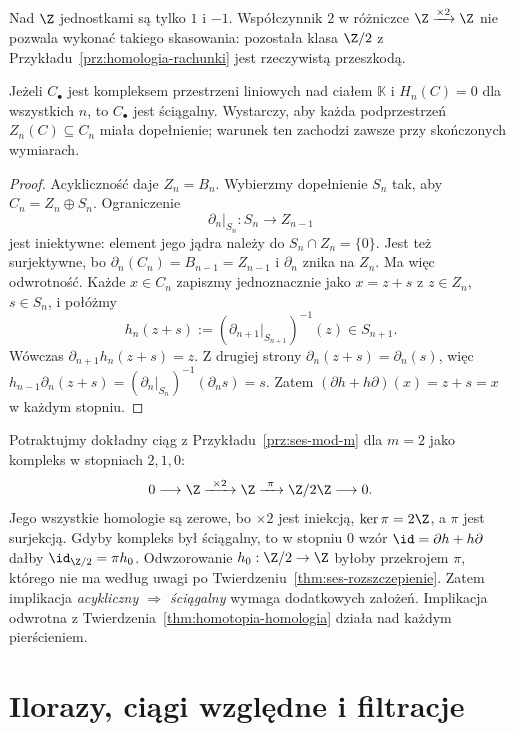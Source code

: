 Nad $\Z$ jednostkami są tylko $1$ i $-1$.
Współczynnik $2$ w różniczce
$\Z\xrightarrow{\times2}\Z$ nie pozwala
wykonać takiego skasowania: pozostała
klasa $\Z/2$ z
Przykładu~\ref{prz:homologia-rachunki}
jest rzeczywistą przeszkodą.

\begin{stwierdzenie}
\label{prop:acykliczny-sciagalny}
Jeżeli $C_\bullet$ jest kompleksem
przestrzeni liniowych nad ciałem
$\mathbb K$ i $H_n(C)=0$ dla wszystkich
$n$, to $C_\bullet$ jest ściągalny.
Wystarczy, aby każda podprzestrzeń
$Z_n(C)\subseteq C_n$ miała dopełnienie;
warunek ten zachodzi zawsze przy
skończonych wymiarach.
\end{stwierdzenie}
\begin{proof}
Acykliczność daje $Z_n=B_n$.
Wybierzmy dopełnienie $S_n$ tak, aby
$C_n=Z_n\oplus S_n$. Ograniczenie
\[
 \partial_n|_{S_n}:S_n\longrightarrow Z_{n-1}
\]
jest iniektywne: element jego jądra
należy do $S_n\cap Z_n=\{0\}$.
Jest też surjektywne, bo
$\partial_n(C_n)=B_{n-1}=Z_{n-1}$
i $\partial_n$ znika na $Z_n$.
Ma więc odwrotność.
Każde $x\in C_n$ zapiszmy
jednoznacznie jako $x=z+s$
z $z\in Z_n$, $s\in S_n$, i połóżmy
\[
 h_n(z+s)
 :=(\partial_{n+1}|_{S_{n+1}})^{-1}(z)
 \in S_{n+1}.
\]
Wówczas $\partial_{n+1}h_n(z+s)=z$.
Z drugiej strony $\partial_n(z+s)=\partial_n(s)$,
więc
$h_{n-1}\partial_n(z+s)
=(\partial_n|_{S_n})^{-1}(\partial_ns)=s$.
Zatem $(\partial h+h\partial)(x)=z+s=x$
w każdym stopniu.
\end{proof}

\begin{przyklad}
\label{prz:acykliczny-niesciagalny}
Potraktujmy dokładny ciąg z
Przykładu~\ref{prz:ses-mod-m} dla $m=2$
jako kompleks w stopniach $2,1,0$:
\[
 0\longrightarrow\Z\xrightarrow{\ \times2\ }\Z
 \xrightarrow{\ \pi\ }\Z/2\Z\longrightarrow0.
\]
Jego wszystkie homologie są zerowe,
bo $\times2$ jest iniekcją,
$\ker\pi=2\Z$, a $\pi$ jest
surjekcją. Gdyby kompleks był
ściągalny, to w stopniu $0$
wzór $\id=\partial h+h\partial$ dałby
$\id_{\Z/2}=\pi h_0$.
Odwzorowanie $h_0:\Z/2\to\Z$ byłoby
przekrojem $\pi$, którego
nie ma według uwagi po
Twierdzeniu~\ref{thm:ses-rozszczepienie}.
Zatem implikacja \emph{acykliczny
$\Rightarrow$ ściągalny} wymaga
dodatkowych założeń. Implikacja
odwrotna z
Twierdzenia~\ref{thm:homotopia-homologia}
działa nad każdym pierścieniem.
\end{przyklad}

\section{Ilorazy, ciągi względne i filtracje}
\label{sec:iloraz-filtracja}

